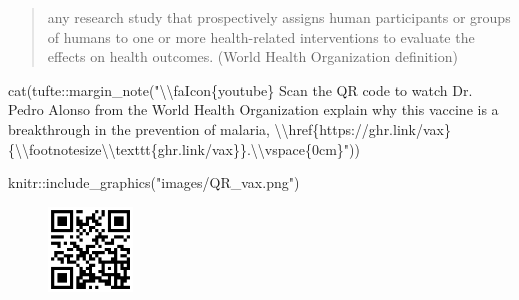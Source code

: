 \documentclass[
  letterpaper,
  DIV=11,
  numbers=noendperiod,
  oneside]{scrartcl}
\newenvironment{Shaded}{\begin{snugshade}}{\end{snugshade}}
\newcommand{\FunctionTok}[1]{\textcolor[rgb]{0.28,0.35,0.67}{#1}}
\newcommand{\NormalTok}[1]{\textcolor[rgb]{0.00,0.23,0.31}{#1}}
\newcommand{\SpecialCharTok}[1]{\textcolor[rgb]{0.37,0.37,0.37}{#1}}
\newcommand{\StringTok}[1]{\textcolor[rgb]{0.13,0.47,0.30}{#1}}
\begin{document}

\begin{quote}
any research study that prospectively assigns human participants or
groups of humans to one or more health-related interventions to evaluate
the effects on health outcomes. (World Health Organization definition)
\end{quote}

\newpage

\vspace{2cm}

\begin{Shaded}
\begin{Highlighting}[]
\FunctionTok{cat}\NormalTok{(tufte}\SpecialCharTok{::}\FunctionTok{margin\_note}\NormalTok{(}\StringTok{"}\SpecialCharTok{\textbackslash{}\textbackslash{}}\StringTok{faIcon\{youtube\} Scan the QR code to watch Dr. Pedro Alonso from the World Health Organization explain why this vaccine is a breakthrough in the prevention of malaria, }\SpecialCharTok{\textbackslash{}\textbackslash{}}\StringTok{href\{https://ghr.link/vax\}\{}\SpecialCharTok{\textbackslash{}\textbackslash{}}\StringTok{footnotesize}\SpecialCharTok{\textbackslash{}\textbackslash{}}\StringTok{texttt\{ghr.link/vax\}\}.}\SpecialCharTok{\textbackslash{}\textbackslash{}}\StringTok{vspace\{0cm\}"}\NormalTok{))}
\end{Highlighting}
\end{Shaded}


\begin{Shaded}
\begin{Highlighting}[]
\NormalTok{knitr}\SpecialCharTok{::}\FunctionTok{include\_graphics}\NormalTok{(}\StringTok{"images/QR\_vax.png"}\NormalTok{)}
\end{Highlighting}
\end{Shaded}

\begin{figure}[H]

{\centering \includegraphics[width=0.2\textwidth,height=\textheight]{images/QR_vax.png}

}

\end{figure}
\end{document}
